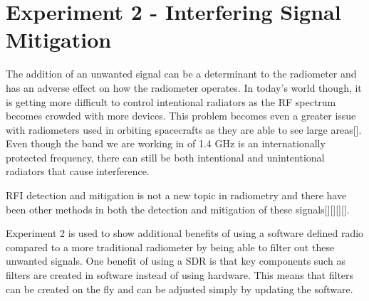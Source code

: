 


\section{Experiment 2 - Interfering Signal Mitigation}
The addition of an unwanted signal can be a determinant to the radiometer and has an adverse effect on how the radiometer operates.  In today's world though, it is getting more difficult to control intentional radiators as the RF spectrum becomes crowded with more devices.  This problem becomes even a greater issue with radiometers used in orbiting spacecrafts as they are able to see large areas[\cite{DeRooRFI}].  Even though the band we are working in of 1.4 GHz is an internationally protected frequency, there can still be both intentional and unintentional radiators that cause interference.

RFI detection and mitigation is not a new topic in radiometry and there have been other methods in both the detection and mitigation of these signals[\cite{Forte}][\cite{McIntyre_RFI}][\cite{DeRoo}][\cite{Ellingson}].

Experiment 2 is used to show additional benefits of using a software defined radio compared to a more traditional radiometer by being able to filter out these unwanted signals.  One benefit of using a SDR is that key components such as filters are created in software instead of using hardware.  This means that filters can be created on the fly and can be adjusted simply by updating the software.  

